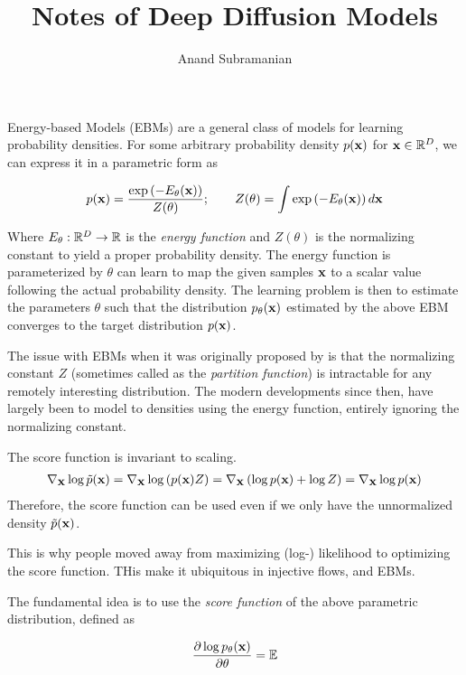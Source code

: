 \documentclass[a4paper, 11pt]{article}
\title{Notes of Deep Diffusion Models}
\author{Anand Subramanian}
\date{}
\begin{document}
 
\maketitle

\tableofcontents


Energy-based Models (EBMs) are a general class of models for learning probability densities. For some arbitrary probability density $p(\mbox{$\mbox{$\mathbf{x}$}$})$ for $\mbox{$\mbox{$\mathbf{x}$}$} \in \mathbb{R}^D$, we can express it in a parametric form as

\begin{align}
p(\mbox{$\mbox{$\mathbf{x}$}$}) = \frac{\exp \left(-E_\theta(\mbox{$\mbox{$\mathbf{x}$}$})\right)}{Z(\theta)}; \qquad Z(\theta) = \int \exp \left (-E_\theta(\mbox{$\mbox{$\mathbf{x}$}$}) \right) d\mbox{$\mbox{$\mathbf{x}$}$}
\end{align} 

Where $E_\theta: \mathbb{R}^D \to \mathbb{R}$ is the \textit{energy function} and $Z(\theta)$ is the normalizing constant to yield a proper probability density. The energy function is parameterized by $\theta$ can learn to map the given samples $\mbox{$\mbox{$\mathbf{x}$}$}$ to a scalar value following the actual probability density. The learning problem is then to estimate the parameters $\theta$ such that the distribution $p_\theta(\mbox{$\mbox{$\mathbf{x}$}$})$ estimated by the above EBM converges to the target distribution $p(\mbox{$\mbox{$\mathbf{x}$}$})$.

The issue with EBMs when it was originally proposed by \cite{lecun2006tutorial} is that the normalizing constant $Z$ (sometimes called as the \textit{partition function}) is intractable for any remotely interesting distribution. The modern developments since then, have largely been to model to densities using the energy function, entirely ignoring the normalizing constant.

The score function is invariant to scaling. 
\begin{align}
    \nabla_{\mbox{$\mbox{$\mathbf{x}$}$}} \log \tilde{p}(\mbox{$\mbox{$\mathbf{x}$}$}) = \nabla_{\mbox{$\mbox{$\mathbf{x}$}$}} \log \left ( p(\mbox{$\mbox{$\mathbf{x}$}$}) Z \right ) = \nabla_{\mbox{$\mbox{$\mathbf{x}$}$}} \left (  \log p(\mbox{$\mbox{$\mathbf{x}$}$}) + \log Z \right ) = \nabla_{\mbox{$\mbox{$\mathbf{x}$}$}} \log  p(\mbox{$\mbox{$\mathbf{x}$}$})
\end{align}
Therefore, the score function can be used even if we only have the unnormalized density $\tilde{p}(\mbox{$\mbox{$\mathbf{x}$}$})$. 

This is why people moved away from maximizing (log-) likelihood to optimizing the score function. THis make it ubiquitous in injective flows, and EBMs.


The fundamental idea is to use the \emph{score function} of the above parametric distribution, defined as 

\begin{align}
    \frac{\partial \log p_\theta(\mbox{$\mbox{$\mathbf{x}$}$})}{\partial \theta} = \mathbb{E} 
\end{align}
\end{document}
